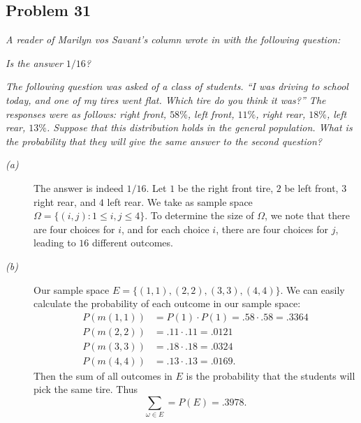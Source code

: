 \documentclass{tufte-handout}
\begin{document}
\subsection{Problem 31}
\begin{description}
\item \textit{A reader of Marilyn vos Savant's column wrote in with
    the following question: }
\item[(a)] \textit{Is the answer $1/16$?}
\item[(b)] \textit{The following question was asked of a class of
    students. ``I was driving to school today, and one of my tires
    went flat. Which tire do you think it was?'' The responses were as
    follows: right front, $58\%$, left front, $11\%$, right rear,
    $18\%$, left rear, $13\%$. Suppose that this distribution holds in
    the general population. What is the probability that they will
    give the same answer to the second question?}
\end{description}

\begin{description}
\item[\emph{(a)}] The answer is indeed $1/16$. Let $1$ be the right front
  tire, $2$ be left front, $3$ right rear, and $4$ left rear. We take as sample space
  $\Omega = \{ (i,j) : 1 \leq i,j \leq 4\}$. To determine the size of
  $\Omega$, we note that there are four choices for $i$, and for each
  choice $i$, there are four choices for $j$, leading to $16$
  different outcomes.
\item[\emph{(b)}] Our sample space $E =
  \{(1,1),(2,2),(3,3),(4,4)\}$. We can easily calculate the
  probability of each outcome in our sample space:
  \begin{align*}
    P(m(1,1)) &= P(1) \cdot P(1) = .58 \cdot .58 = .3364\\
    P(m(2,2)) &= .11 \cdot .11 = .0121\\
    P(m(3,3)) &= .18 \cdot .18 = .0324\\
    P(m(4,4)) &= .13 \cdot .13 = .0169.
  \end{align*}
  Then the sum of all outcomes in $E$ is the probability that the
  students will pick the same tire. Thus
  \[\sum_{\omega \in E} = P(E) = .3978.\]
\end{description}
\end{document}
